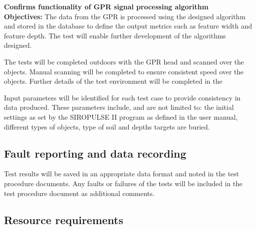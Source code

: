 \documentclass[main.tex]{subfiles}
\begin{document}
\begin{appendices}
\begin{gpr}
\textbf{Confirms functionality of GPR signal processing algorithm}\\
\textbf{Objectives:} The data from the GPR is processed using the designed algorithm and stored in the database to define the output metrics such as feature width and feature depth. The test will enable further development of the algorithms designed. 
\end{gpr}


\medskip\noindent
The tests will be completed outdoors with the GPR head and scanned over the objects. Manual scanning will be completed to ensure consistent speed over the objects. Further details of the test environment will be completed in the 

\medskip\noindent
Input parameters will be identified for each test case to provide consistency in data produced. These parameters include, and are not limited to: the initial settings as set by the SIROPULSE II program as defined in the user manual, different types of objects, type of soil and depths targets are buried.

\subsection{Fault reporting and data recording}
Test results will be saved in an appropriate data format and noted in the test procedure documents. Any faults or failures of the tests will be included in the test procedure document as additional comments. 

\subsection{Resource requirements}


\end{appendices}
\end{document}
